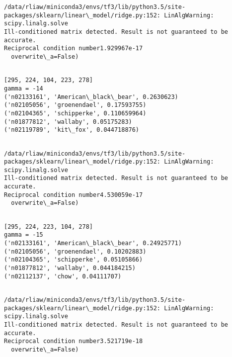 \documentclass[11pt]{article}
\begin{document}
    \begin{Verbatim}[commandchars=\\\{\}]
/data/rliaw/miniconda3/envs/tf3/lib/python3.5/site-packages/sklearn/linear\_model/ridge.py:152: LinAlgWarning: scipy.linalg.solve
Ill-conditioned matrix detected. Result is not guaranteed to be accurate.
Reciprocal condition number1.929967e-17
  overwrite\_a=False)

    \end{Verbatim}

    \begin{Verbatim}[commandchars=\\\{\}]

[295, 224, 104, 223, 278]
gamma = -14
('n02133161', 'American\_black\_bear', 0.2630623)
('n02105056', 'groenendael', 0.17593755)
('n02104365', 'schipperke', 0.110659964)
('n01877812', 'wallaby', 0.05175283)
('n02119789', 'kit\_fox', 0.044718876)


    \end{Verbatim}

    \begin{Verbatim}[commandchars=\\\{\}]
/data/rliaw/miniconda3/envs/tf3/lib/python3.5/site-packages/sklearn/linear\_model/ridge.py:152: LinAlgWarning: scipy.linalg.solve
Ill-conditioned matrix detected. Result is not guaranteed to be accurate.
Reciprocal condition number4.530059e-17
  overwrite\_a=False)

    \end{Verbatim}

    \begin{Verbatim}[commandchars=\\\{\}]

[295, 224, 223, 104, 278]
gamma = -15
('n02133161', 'American\_black\_bear', 0.24925771)
('n02105056', 'groenendael', 0.10202883)
('n02104365', 'schipperke', 0.05105866)
('n01877812', 'wallaby', 0.044184215)
('n02112137', 'chow', 0.04111707)


    \end{Verbatim}

    \begin{Verbatim}[commandchars=\\\{\}]
/data/rliaw/miniconda3/envs/tf3/lib/python3.5/site-packages/sklearn/linear\_model/ridge.py:152: LinAlgWarning: scipy.linalg.solve
Ill-conditioned matrix detected. Result is not guaranteed to be accurate.
Reciprocal condition number3.521719e-18
  overwrite\_a=False)

    \end{Verbatim}
\end{document}
